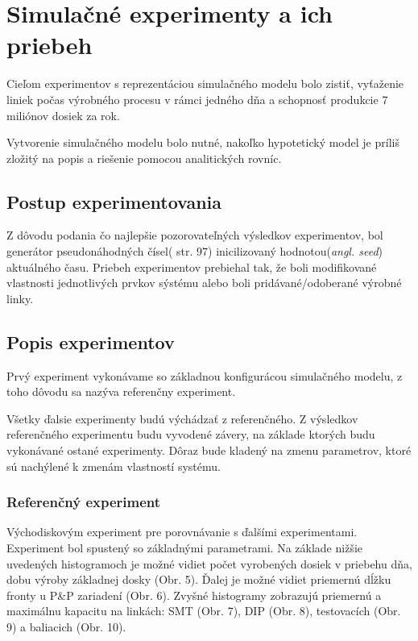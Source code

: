 \documentclass[12pt,a4paper,titlepage,final]{article}
\begin{document}
\section{Simulačné experimenty a ich priebeh}
Cieľom experimentov s reprezentáciou simulačného modelu bolo zistiť, vyťaženie
liniek počas výrobného procesu v rámci jedného dňa a schopnosť produkcie 7 miliónov
dosiek za rok\cite{gigabyte-sprava}.

Vytvorenie simulačného modelu bolo nutné, nakoľko hypotetický model je príliš
zložitý na popis a riešenie pomocou analitických rovníc.

\subsection{Postup experimentovania}
Z dôvodu podania čo najlepšie pozorovateľných výsledkov experimentov, bol 
generátor pseudonáhodných čísel(\cite{peringer-slidy} str. 97) inicilizovaný hodnotou(\textit{angl. seed})
aktuálného času. Priebeh experimentov prebiehal tak, že boli modifikované 
vlastnosti jednotlivých prvkov sýstému alebo boli pridávané/odoberané výrobné
linky.

\subsection{Popis experimentov}
Prvý experiment vykonávame so základnou konfigurácou simulačného modelu, z toho 
dôvodu sa nazýva referenčny experiment. 

Všetky ďalsie experimenty budú výchádzať z referenčného. Z výsledkov referenčného
experimentu budu vyvodené závery, na základe ktorých budu vykonávané ostané experimenty.
Dôraz bude kladený na zmenu parametrov, ktoré sú nachýlené k zmenám vlastností
systému.

\subsubsection{Referenčný experiment}
Východiskovým experiment pre porovnávanie s ďalšími experimentami.
Experiment bol spustený so základnými parametrami. Na základe nižšie uvedených histogramoch
je možné vidiet počet vyrobených dosiek v priebehu dňa, dobu 
výroby základnej dosky (Obr. 5). Ďalej je možné vidiet priemernú dĺžku
fronty u P\&P zariadení (Obr. 6). Zvyšné histogramy zobrazujú priemernú a maximálnu
kapacitu na linkách: SMT (Obr. 7), DIP (Obr. 8), testovacích (Obr. 9) a baliacich (Obr. 10).
\end{document}
